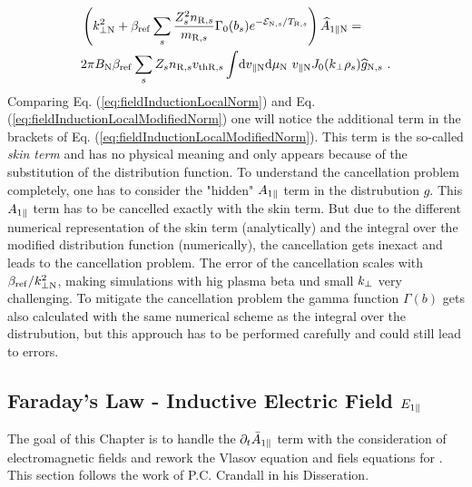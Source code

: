 \begin{gather}
    \begin{aligned}
        &\left(k_{\perp \mathrm{N}}^2 + \beta_\mathrm{ref} \sum_s \frac{Z^2_sn_{\mathrm{R},s}}{m_{\mathrm{R},s}} \Gamma_0(b_s) e^{-\mathcal{E}_{\mathrm{N},s}/T_{\mathrm{R},s}} \right) \widehat{A}_{1\parallel \mathrm{N}} = \\
        & 2\pi B_\mathrm{N} \beta_\mathrm{ref} \sum_s Z_s n_{\mathrm{R},s} v_{\mathrm{th}\mathrm{R},s} \int \! \mathrm{d}v_{\parallel \mathrm{N}} \mathrm{d}\mu_\mathrm{N} ~ v_{\parallel \mathrm{N}} J_0(k_\perp \rho_s) \widehat{g}_{\mathrm{N},s} ~.
    \end{aligned}
    \label{eq:fieldInductionLocalModifiedNorm}
\end{gather}
Comparing Eq. (\ref{eq:fieldInductionLocalNorm}) and Eq. (\ref{eq:fieldInductionLocalModifiedNorm}) one will notice the additional term in the brackets of Eq. (\ref{eq:fieldInductionLocalModifiedNorm}). This term is the so-called \textit{skin term} \cite{Mishchenko2017} and has no physical meaning and only appears because of the substitution of the distribution function. To understand the cancellation problem completely, one has to consider the "hidden" $A_{1\parallel}$ term in the distrubution $g$. This $A_{1\parallel}$ term has to be cancelled exactly with the skin term. But due to the different numerical representation of the skin term (analytically) and the integral over the modified distribution function (numerically), the cancellation gets inexact and leads to the cancellation problem. The error of the cancellation scales with $\beta_\mathrm{ref}/k_{\perp \mathrm{N}}^2$, making simulations with hig plasma beta und small $k_\perp$ very challenging. To mitigate the cancellation problem the gamma function $\Gamma(b)$ gets also calculated with the same numerical scheme as the integral over the distrubution, but this approuch has to be performed carefully and could still lead to errors.
\newpage

\subsection{Faraday's Law - Inductive Electric Field $E_{1\parallel}$}
\label{sub:fieldEpar}

The goal of this Chapter is to handle the $\partial_t \bar{A}_{1\parallel}$ term with the consideration of electromagnetic fields and rework the Vlasov equation and fiels equations for \gkw. This section follows the work of P.C. Crandall in his Disseration\cite{Crandall_PHD}.
\bigskip

